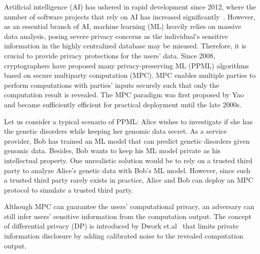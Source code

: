 



Artificial intelligence (AI) has ushered in rapid development since 2012, where the number of software projects that rely on AI has increased significantly~\cite{clark_2015}. However, as an essential branch of AI, machine learning (ML) heavily relies on massive data analysis, posing severe privacy concerns as the individual's sensitive information in the highly centralized database may be misused. Therefore, it is crucial to provide privacy protections for the users' data. Since 2008, cryptographers have proposed many privacy-preserving ML (PPML) algorithms based on secure multiparty computation (MPC). MPC enables multiple parties to perform computations with parties' inputs securely such that only the computation result is revealed. The MPC paradigm was first proposed by Yao~\cite{yao1986generate} and became sufficiently efficient for practical deployment until the late 2000s.

Let us consider a typical scenario of PPML: Alice wishes to investigate if she has the genetic disorders while keeping her genomic data secret. As a service provider, Bob has trained an ML model that can predict genetic disorders given genomic data. Besides, Bob wants to keep his ML model private as his intellectual property. One unrealistic solution would be to rely on a trusted third party to analyze Alice's genetic data with Bob's ML model. However, since such a trusted third party rarely exists in practice, Alice and Bob can deploy an MPC protocol to simulate a trusted third party.

Although MPC can guarantee the users' computational privacy, an adversary can still infer users' sensitive information from the computation output.  The concept of differential privacy (DP) is introduced by Dwork et.al~\cite{dwork2006differential, dwork2006calibrating} that limits private information disclosure by adding calibrated noise to the revealed computation output.

